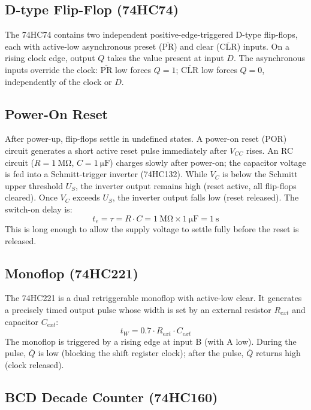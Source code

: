 \documentclass[12pt, a4paper]{article}
\begin{document}
\subsection{D-type Flip-Flop (74HC74)}

The 74HC74 contains two independent positive-edge-triggered D-type flip-flops, each
with active-low asynchronous preset ($\overline{\text{PR}}$) and clear
($\overline{\text{CLR}}$) inputs.
On a rising clock edge, output $Q$ takes the value present at input $D$.
The asynchronous inputs override the clock: $\overline{\text{PR}}$ low forces
$Q = 1$; $\overline{\text{CLR}}$ low forces $Q = 0$, independently of the clock
or $D$.

\subsection{Power-On Reset}

After power-up, flip-flops settle in undefined states.
A power-on reset (POR) circuit generates a short active reset pulse immediately
after $V_{CC}$ rises.
An RC circuit ($R = \SI{1}{\mega\ohm}$, $C = \SI{1}{\micro\farad}$) charges slowly
after power-on; the capacitor voltage is fed into a Schmitt-trigger inverter
(74HC132).
While $V_C$ is below the Schmitt upper threshold $U_S$, the inverter output remains
high (reset active, all flip-flops cleared).
Once $V_C$ exceeds $U_S$, the inverter output falls low (reset released).
The switch-on delay is:
\[
  t_e = \tau = R \cdot C = \SI{1}{\mega\ohm} \times \SI{1}{\micro\farad}
  = \SI{1}{\second}
\]
This is long enough to allow the supply voltage to settle fully before the reset
is released.

\subsection{Monoflop (74HC221)}

The 74HC221 is a dual retriggerable monoflop with active-low clear.
It generates a precisely timed output pulse whose width is set by an external
resistor $R_{ext}$ and capacitor $C_{ext}$:
\begin{equation}
  t_W = 0.7 \cdot R_{ext} \cdot C_{ext}
  \label{eq:monoflop}
\end{equation}
The monoflop is triggered by a rising edge at input B (with A low).
During the pulse, $\overline{Q}$ is low (blocking the shift register clock);
after the pulse, $\overline{Q}$ returns high (clock released).

\subsection{BCD Decade Counter (74HC160)}
\end{document}
